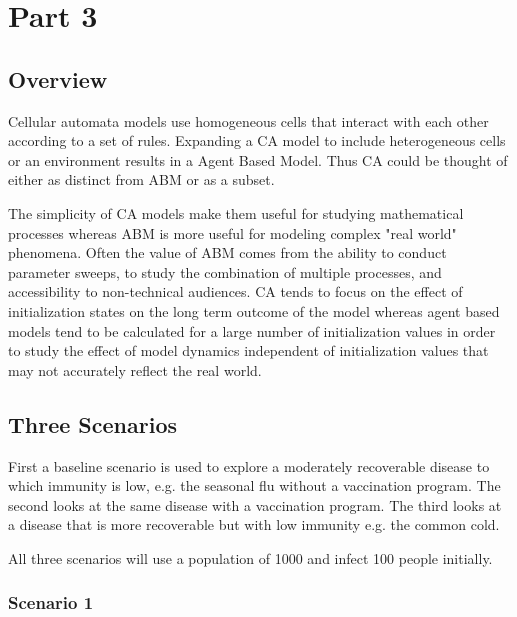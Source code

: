 \documentclass[11pt]{article} %
\begin{document}


\pagebreak

\section{Part 3}

\subsection{Overview}

Cellular automata models use homogeneous cells that interact with each other according to a set of rules. Expanding a CA model to include heterogeneous cells or an environment results in a Agent Based Model. Thus CA could be thought of either as distinct from ABM or as a subset. 
 
The simplicity of CA models make them useful for studying mathematical processes whereas ABM is more useful for modeling complex "real world" phenomena. Often the value of ABM comes from the ability to conduct parameter sweeps, to study the combination of multiple processes, and accessibility to non-technical audiences. CA tends to focus on the effect of initialization states on the long term outcome of the model whereas agent based models tend to be calculated for a large number of initialization values in order to study the effect of model dynamics independent of initialization values that may not accurately reflect the real world. 

\subsection{Three Scenarios}

First a baseline scenario is used to explore a moderately recoverable disease to which immunity is low, e.g. the seasonal flu without a vaccination program. The second looks at the same disease with a vaccination program. The third looks at a disease that is more recoverable but with low immunity e.g. the common cold. 

All three scenarios will use a population of 1000 and infect 100 people initially. 

\subsubsection{Scenario 1}
\end{document}
